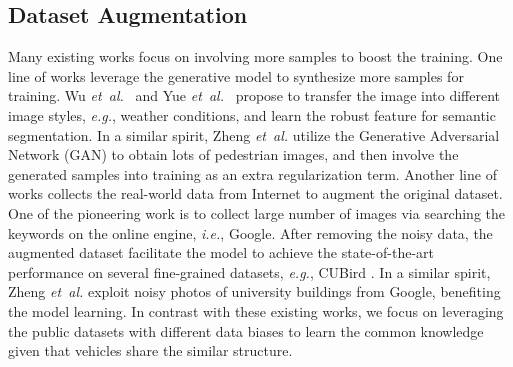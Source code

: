 \documentclass[journal]{IEEEtran}
\def\eg{\emph{e.g.}}
\def\ie{\emph{i.e.}}
\def\etal{\emph{et~al.}}
\begin{document}
\subsection{Dataset Augmentation}
Many existing works focus on involving more samples to boost the training. One line of works leverage the generative model to synthesize more samples for training. Wu \etal~\cite{wu2019ace} and Yue \etal~\cite{yue2019domain} propose to transfer the image into different image styles, \eg, weather conditions, and learn the robust feature for semantic segmentation.
In a similar spirit, Zheng \etal \cite{zheng2017unlabeled,zheng2019joint} utilize the Generative Adversarial Network (GAN) \cite{goodfellow2014generative} to obtain lots of pedestrian images, and then involve the generated samples into  training as an extra regularization term. 
Another line of works collects the real-world data from Internet to augment the original dataset. One of the pioneering work \cite{krause2016unreasonable} is to collect large number of images via searching the keywords on the online engine, \ie, Google. After removing the noisy data, the augmented dataset facilitate the model to achieve the state-of-the-art performance on several fine-grained datasets, \eg, CUBird \cite{WahCUB_200_2011}. In a similar spirit, Zheng \etal \cite{zheng2020university} exploit noisy photos of university buildings from Google, benefiting the model learning. In contrast with these existing works, we focus on leveraging the public datasets with different data biases to learn the common knowledge given that vehicles
share the similar structure.  
\end{document}
